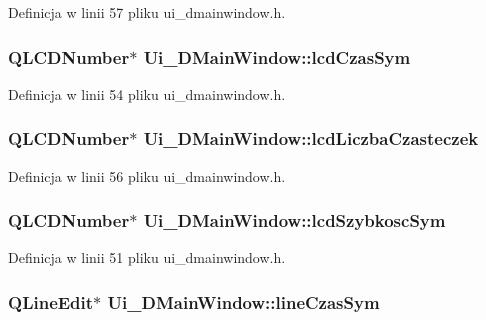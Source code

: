 Definicja w linii 57 pliku ui\-\_\-dmainwindow.\-h.

\hypertarget{class_ui___d_main_window_af49335a21dc17e53674f8b62a640ca2d}{
\subsubsection[{lcd\-Czas\-Sym}]{\setlength{\rightskip}{0pt plus 5cm}Q\-L\-C\-D\-Number$\ast$ Ui\-\_\-\-D\-Main\-Window\-::lcd\-Czas\-Sym}}\label{class_ui___d_main_window_af49335a21dc17e53674f8b62a640ca2d}


Definicja w linii 54 pliku ui\-\_\-dmainwindow.\-h.

\hypertarget{class_ui___d_main_window_a3d6afe29d882b3a9119b68d79c9b5e0f}{
\subsubsection[{lcd\-Liczba\-Czasteczek}]{\setlength{\rightskip}{0pt plus 5cm}Q\-L\-C\-D\-Number$\ast$ Ui\-\_\-\-D\-Main\-Window\-::lcd\-Liczba\-Czasteczek}}\label{class_ui___d_main_window_a3d6afe29d882b3a9119b68d79c9b5e0f}


Definicja w linii 56 pliku ui\-\_\-dmainwindow.\-h.

\hypertarget{class_ui___d_main_window_a4eb8e2a87080f4f314eb96c52a82e39d}{
\subsubsection[{lcd\-Szybkosc\-Sym}]{\setlength{\rightskip}{0pt plus 5cm}Q\-L\-C\-D\-Number$\ast$ Ui\-\_\-\-D\-Main\-Window\-::lcd\-Szybkosc\-Sym}}\label{class_ui___d_main_window_a4eb8e2a87080f4f314eb96c52a82e39d}


Definicja w linii 51 pliku ui\-\_\-dmainwindow.\-h.

\hypertarget{class_ui___d_main_window_aad165daf4686baecb2ccd6709c629579}{
\subsubsection[{line\-Czas\-Sym}]{\setlength{\rightskip}{0pt plus 5cm}Q\-Line\-Edit$\ast$ Ui\-\_\-\-D\-Main\-Window\-::line\-Czas\-Sym}}\label{class_ui___d_main_window_aad165daf4686baecb2ccd6709c629579}



